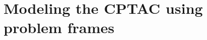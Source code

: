 \documentclass[Main_Assignment2]{subfiles}
\begin{document}
\section{Modeling the CPTAC using problem frames}
\end{document}
